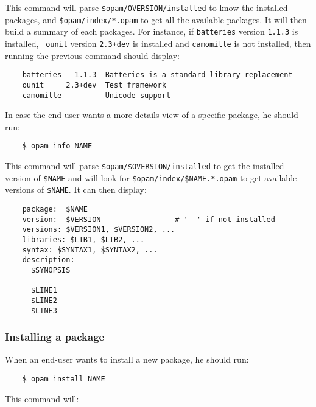 \documentclass[a4paper,11pt]{article}
\begin{document}
This command will parse \verb+$opam/OVERSION/installed+ to know the
installed packages, and \verb+$opam/index/*.opam+ to get all the
available packages. It will then build a summary of each packages. For
instance, if {\tt batteries} version {\tt 1.1.3} is installed, {\tt
  ounit} version {\tt 2.3+dev} is installed and {\tt camomille} is not
installed, then running the previous command should display:

\begin{verbatim}
    batteries   1.1.3  Batteries is a standard library replacement
    ounit     2.3+dev  Test framework
    camomille      --  Unicode support
\end{verbatim}


In case the end-user wants a more details view of a specific package,
he should run:

\begin{verbatim}
    $ opam info NAME
\end{verbatim}

This command will parse \verb+$opam/$OVERSION/installed+ to get the
installed version of \verb+$NAME+ and will look for
\verb+$opam/index/$NAME.*.opam+ to get available versions of
\verb+$NAME+. It can then display:

\begin{verbatim}
    package:  $NAME
    version:  $VERSION                 # '--' if not installed
    versions: $VERSION1, $VERSION2, ...
    libraries: $LIB1, $LIB2, ...
    syntax: $SYNTAX1, $SYNTAX2, ...
    description:
      $SYNOPSIS

      $LINE1
      $LINE2
      $LINE3
\end{verbatim}

\subsubsection{Installing a package}
\label{opam-install}

When an end-user wants to install a new package, he should run:

\begin{verbatim}
    $ opam install NAME
\end{verbatim}

This command will:
\end{document}
